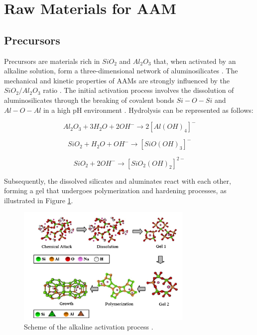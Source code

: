 \section{Raw Materials for AAM}

\subsection{Precursors}

Precursors are materials rich in $SiO_2$ and $Al_2O_3$ that, when activated by an alkaline solution, form a three-dimensional network of aluminosilicates \cite{rakhimova2019metakaolin}.
The mechanical and kinetic properties of AAMs are strongly influenced by the $SiO_2/Al_2O_3$ ratio \cite{provis2007geopolymerisation}.
The initial activation process involves the dissolution of aluminosilicates through the breaking of covalent bonds $Si-O-Si$ and $Al-O-Al$ in a high pH environment \cite{Severo2013}. Hydrolysis can be represented as follows:

\begin{equation}
  Al_2O_3 + 3H_2O + 2OH^- \rightarrow 2\left[Al(OH)_4\right]^- 
\end{equation}

\begin{equation}
  SiO_2 + H_2O + OH^- \rightarrow \left[SiO(OH)_3\right]^- 
\end{equation}

\begin{equation}
  SiO_2 + 2OH^- \rightarrow \left[SiO_2(OH)_2\right]^{2-}
\end{equation}

Subsequently, the dissolved silicates and aluminates react with each other, forming a gel that undergoes polymerization and hardening processes, as illustrated in Figure \ref{fig:activation}.

\begin{figure}[ht]
  \centering
  \includegraphics[width=0.75\textwidth]{Cap2/images/activation.png}
  \caption{Scheme of the alkaline activation process \cite{duxson2006geopolymer}.}
  \label{fig:activation}
\end{figure}

